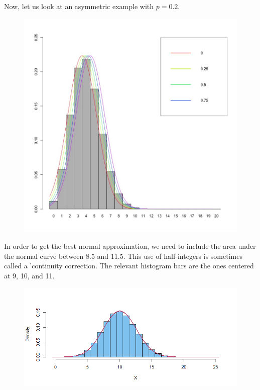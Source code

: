 \documentclass{article}
\begin{document}
Now, let us look at an asymmetric example with $p =0.2$.
\begin{figure}
    \centering
    \includegraphics[width=1\linewidth]{figures/oChLi.jpg}
    \label{fig:enter-label}
\end{figure}
In order to get the best normal approximation, we need to include the area under the normal curve between 8.5 and 11.5. This use of half-integers is sometimes called a 'continuity correction. The relevant histogram bars are the ones centered at 9, 10, and 11.
\begin{figure}
    \centering
    \includegraphics[width=1\linewidth]{figures/7Az90.png}
    \label{fig:enter-label}
\end{figure}
\end{document}
